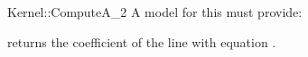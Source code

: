 \begin{ccRefFunctionObjectConcept}{Kernel::ComputeA_2}
A model for this must provide:


       {returns the coefficient  of the line with equation .}

\ccRefines
{}



\end{ccRefFunctionObjectConcept}
